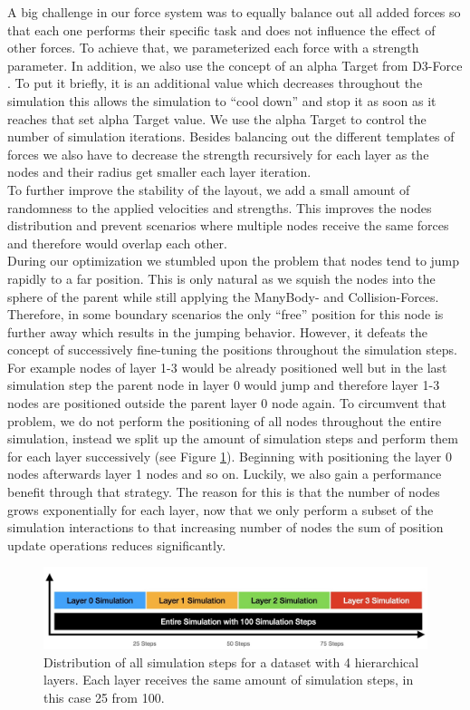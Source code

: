 A big challenge in our force system was to equally balance out all added forces so that each one performs their specific task and does not influence the effect of other forces. To achieve that, we parameterized each force with a strength parameter.
In addition, we also use the concept of an alpha Target from D3-Force \cite{bostock_d3forcejs_nodate}. To put it briefly, it is an additional value which decreases throughout the simulation this allows the simulation to “cool down” and stop it as soon as it reaches that set alpha Target value. We use the alpha Target to control the number of simulation iterations. 
Besides balancing out the different templates of forces we also have to decrease the strength recursively for each layer as the nodes and their radius get smaller each layer iteration.\\
To further improve the stability of the layout, we add a small amount of randomness to the applied velocities and strengths. This improves the nodes distribution and prevent scenarios where multiple nodes receive the same forces and therefore would overlap each other.\\
During our optimization we stumbled upon the problem that nodes tend to jump rapidly to a far position. This is only natural as we squish the nodes into the sphere of the parent while still applying the ManyBody- and Collision-Forces. Therefore, in some boundary scenarios the only “free” position for this node is further away which results in the jumping behavior. However, it defeats the concept of successively fine-tuning the positions throughout the simulation steps. For example nodes of layer 1-3 would be already positioned well but in the last simulation step the parent node in layer 0 would jump and therefore layer 1-3 nodes are positioned outside the parent layer 0 node again. To circumvent that problem, we do not perform the positioning of all nodes throughout the entire simulation, instead we split up the amount of simulation steps and perform them for each layer successively (see Figure \ref{fig:SimulationSteps}). Beginning with positioning the layer 0 nodes afterwards layer 1 nodes and so on. Luckily, we also gain a performance benefit through that strategy. The reason for this is that the number of nodes grows exponentially for each layer, now that we only perform a subset of the simulation interactions to that increasing number of nodes the sum of position update operations reduces significantly.
\begin{figure}[h]
    \centering
    \includegraphics[width=\textwidth]{graphics/simulationStepsSplit.jpg}
    \caption[Distribution of all simulation steps.]{Distribution of all simulation steps for a dataset with 4 hierarchical layers. Each layer receives the same amount of simulation steps, in this case 25 from 100.} %
    \label{fig:SimulationSteps} 
  \end{figure}
